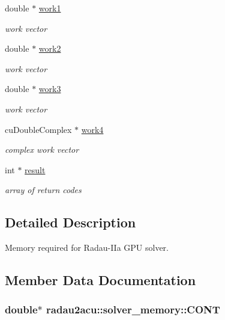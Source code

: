 \begin{DoxyCompactItemize}
double $\ast$ \hyperlink{structradau2acu_1_1solver__memory_a2512e6fe1af56ee636bd449272292281}{work1}
\begin{DoxyCompactList}\small\item\em work vector \end{DoxyCompactList}\item 
double $\ast$ \hyperlink{structradau2acu_1_1solver__memory_a835223221d3f704f6cac19ef71888700}{work2}
\begin{DoxyCompactList}\small\item\em work vector \end{DoxyCompactList}\item 
double $\ast$ \hyperlink{structradau2acu_1_1solver__memory_addc4decdb12feacf160e9559fc146870}{work3}
\begin{DoxyCompactList}\small\item\em work vector \end{DoxyCompactList}\item 
cu\+Double\+Complex $\ast$ \hyperlink{structradau2acu_1_1solver__memory_aae4ce4cf4c0399ed3f892c34e63606fe}{work4}
\begin{DoxyCompactList}\small\item\em complex work vector \end{DoxyCompactList}\item 
int $\ast$ \hyperlink{structradau2acu_1_1solver__memory_a4c4c20676cc0589db565d85401f08c22}{result}
\begin{DoxyCompactList}\small\item\em array of return codes \end{DoxyCompactList}\end{DoxyCompactItemize}


\subsection{Detailed Description}
Memory required for Radau-\/\+I\+Ia G\+PU solver. 

\subsection{Member Data Documentation}
\subsubsection[{\texorpdfstring{C\+O\+NT}{CONT}}]{\setlength{\rightskip}{0pt plus 5cm}double$\ast$ radau2acu\+::solver\+\_\+memory\+::\+C\+O\+NT}\hypertarget{structradau2acu_1_1solver__memory_a6b70e663fca70c209479ba26b89518d9}{}\label{structradau2acu_1_1solver__memory_a6b70e663fca70c209479ba26b89518d9}


